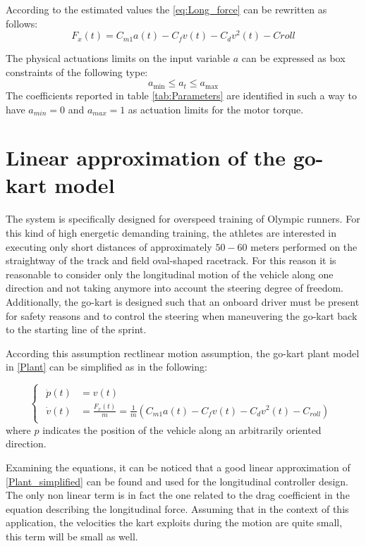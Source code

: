 \documentclass[a4paper,12pt,oneside]{book}
\begin{document}
According to the estimated values the \eqref{eq:Long_force} can be rewritten as follows:
\begin{equation}
    F_x(t) = C_{m1} a(t) - C_f v(t) - C_d v^2(t) - Croll
\end{equation}

The physical actuations limits on the input variable $a$ can be expressed as box constraints of the following type:
\begin{equation}
    a_{\text{min}} \leq a_t \leq a_{\text{max}}
\label{Input_limits}
\end{equation}
The coefficients reported in table \ref{tab:Parameters} are identified in such a way to have $a_{min} = 0$ and $a_{max} = 1$ as actuation limits for the motor torque.

\section{Linear approximation of the go-kart model}
The system is specifically designed for overspeed training of Olympic runners.
For this kind of high energetic demanding training, the athletes are interested in executing only short distances of approximately  $50-60$ meters performed on the straightway of the track and field oval-shaped racetrack.
For this reason it is reasonable to consider only the longitudinal motion of the vehicle along one direction and not taking anymore into account the steering degree of freedom. 
Additionally, the go-kart is designed such that an onboard driver must be present for safety reasons and to control the steering when maneuvering the go-kart back to the starting line of the sprint.

\bigskip
According this assumption rectlinear motion assumption, the go-kart plant model in \eqref{Plant} can be simplified as in the following:

\begin{equation}
\begin{cases}
 	\begin{aligned}
		\dot{p}(t) &= v(t) \\
		\dot{v}(t) &= \frac{F_x(t)}{m} = \frac{1}{m} (C_{m1} a(t) - C_f v(t) - C_d v^2(t) - C_{roll} )
	\end{aligned}
\end{cases}
\label{Plant_simplified}
\end{equation}
where $p$ indicates the position of the vehicle along an arbitrarily oriented direction.

\bigskip
Examining the equations, it can be noticed that a good linear approximation of \eqref{Plant_simplified} can be found and used for the longitudinal controller design. 
The only non linear term is in fact the one related to the drag coefficient in the equation describing the longitudinal force.
Assuming that in the context of this application, the velocities the kart exploits during the motion are quite small, this term will be small as well.
\end{document}
